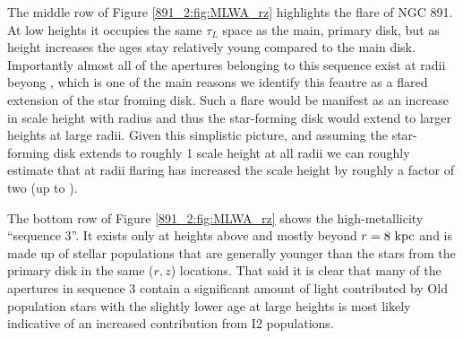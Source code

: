 
The middle row of Figure \ref{891_2:fig:MLWA_rz} highlights the flare of NGC
891. At low heights it occupies the same $\tau_L$ space as the main,
primary disk, but as height increases the ages stay relatively young
compared to the main disk. Importantly almost all of the apertures
belonging to this sequence exist at radii beyong , which
is one of the main reasons we identify this feautre as a flared
extension of the star froming disk. Such a flare would be manifest as
an increase in scale height with radius and thus the star-forming disk
would extend to larger heights at large radii. Given this simplistic
picture, and assuming the star-forming disk extends to roughly 1 scale
height at all radii we can roughly estimate that at radii  flaring has increased the scale height by roughly a factor
of two (up to ).


The bottom row of Figure \ref{891_2:fig:MLWA_rz} shows the high-metallicity
``sequence 3''. It exists only at heights above  and
mostly beyond $r = 8~\mathrm{kpc} $ and is made up of stellar populations
that are generally younger than the stars from the primary disk
in the same ($r,z$) locations. That said it is clear that many of the
apertures in sequence 3 contain a significant amount of light
contributed by Old population stars with the slightly lower age at large
heights is most likely indicative of an increased contribution from I2
populations.



